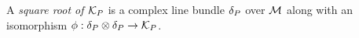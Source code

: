 \documentclass[notas.tex]{subfiles}
\begin{document}






\begin{defn}
	A \emph{square root of $\mathcal{K}_P$} is a complex line bundle $\delta_P$ over $\mathcal{M}$ along with an isomorphism $\phi: \delta_P \otimes \delta_P \to \mathcal{K}_P$. 
\end{defn}
\end{document}
